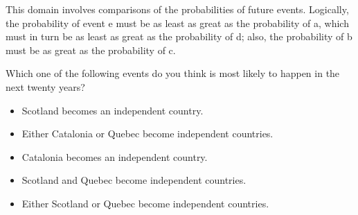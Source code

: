 
This domain involves comparisons of the probabilities of future events.
Logically, the probability of event e must be as least as great as the probability of a, which must in turn be as least as great as the probability of d; also, the probability of b must be as great as the probability of c.

\begin{tcolorbox}
Which one of the following events do you think is most likely to happen in the next twenty years?

\begin{itemize}
	\setlength\itemsep{-5pt}
	\item Scotland becomes an independent country.
	\item Either Catalonia or Quebec become independent countries.
	\item Catalonia becomes an independent country.
	\item Scotland and Quebec become independent countries.
	\item Either Scotland or Quebec become independent countries.
\end{itemize}
\end{tcolorbox}
